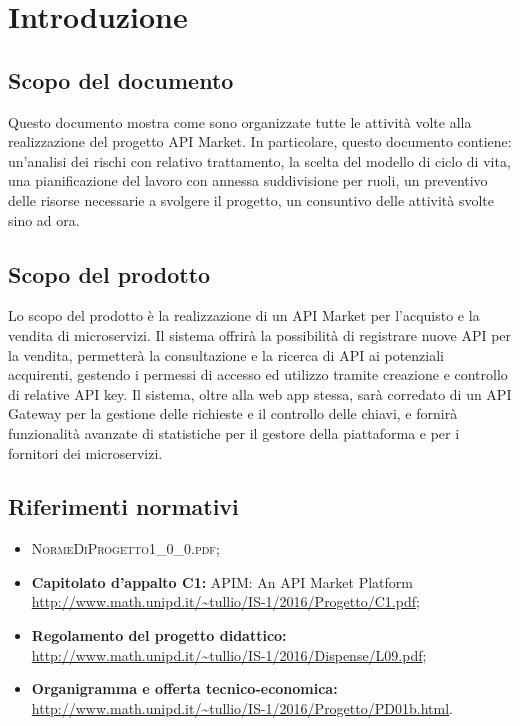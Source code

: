 \newpage
\section{Introduzione}

\subsection{Scopo del documento}
Questo documento mostra come sono organizzate tutte le attività volte alla realizzazione del progetto API Market. In particolare, questo documento contiene: un'analisi dei rischi con relativo trattamento, la scelta del modello di ciclo di vita, una pianificazione del lavoro con annessa suddivisione per ruoli, un preventivo delle risorse necessarie a svolgere il progetto, un consuntivo delle attività svolte sino ad ora.

\subsection{Scopo del prodotto}
Lo scopo del prodotto è la realizzazione di un API Market per l'acquisto e la vendita di microservizi. Il sistema offrirà la possibilità di registrare nuove API per la vendita, permetterà la consultazione e la ricerca di API ai potenziali acquirenti, gestendo i permessi di accesso ed utilizzo tramite creazione e controllo di relative API key. Il sistema, oltre alla web app stessa, sarà corredato di un API Gateway per la gestione delle richieste e il controllo delle chiavi, e fornirà funzionalità avanzate di statistiche per il gestore della piattaforma e per i fornitori dei microservizi.

\subsection{Riferimenti normativi}
\begin{itemize}
\item \textsc{NormeDiProgetto1\_0\_0.pdf};
\item \textbf{Capitolato d’appalto C1:} APIM: An API Market Platform\\ \url{http://www.math.unipd.it/~tullio/IS-1/2016/Progetto/C1.pdf};
\item \textbf{Regolamento del progetto didattico:}\\
\url{http://www.math.unipd.it/~tullio/IS-1/2016/Dispense/L09.pdf};
\item \textbf{Organigramma e offerta tecnico-economica:}\\
\url{http://www.math.unipd.it/~tullio/IS-1/2016/Progetto/PD01b.html}.
\end{itemize}

